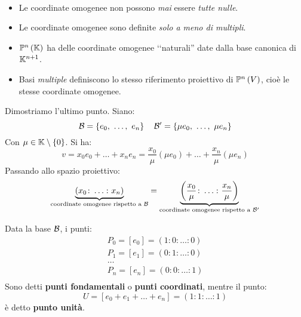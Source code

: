 \begin{observe}~{}
		\begin{itemize}
		\item Le coordinate omogenee non possono \textit{mai} essere \textit{tutte nulle}.
		\item Le coordinate omogenee sono definite \textit{solo a meno di multipli}.
		\item $\proj[n]{\kamp}$ ha delle coordinate omogenee ‘‘naturali'' date dalla base canonica di $\mathbb{K}^{n+1}$.
		\item Basi \textit{multiple} definiscono lo stesso riferimento proiettivo di $\proj{V}$, cioè le stesse coordinate omogenee.
	\end{itemize}
\end{observe}
\begin{demonstration}
	Dimostriamo l'ultimo punto. Siano:
	\begin{equation*}
		\basis=\left\{e_0,\ \ldots,\ e_n\right\}\quad\basis'=\left\{\mu e_0,\ \ldots,\ \mu e_n\right\}
	\end{equation*}
Con $\mu\in\mathbb{K}\setminus\left\{0\right\}$. Si ha:
\begin{equation*}
	v=x_0e_0+\ldots+x_ne_n=\frac{x_0}{\mu}\left(\mu e_0\right)+\ldots + \frac{x_n}{\mu}\left(\mu e_n\right)
\end{equation*}
Passando allo spazio proiettivo:
\begin{equation*}
\underbrace{\left(x_0\colon\ldots\colon x_n\right)}_{\text{coordinate omogenee rispetto a }\mathcal{B}}=\underbrace{\left(\frac{x_0}{\mu}\colon\ldots\colon \frac{x_n}{\mu}\right)}_{\text{coordinate omogenee rispetto a }\mathcal{B}'}
\end{equation*}
\end{demonstration}
\begin{define}
	Data la base $\mathcal{B}$, i punti:
	\begin{equation}
		\begin{array}{l}
			P_0=\left[e_0\right]=\left(1\colon0\colon\ldots\colon0\right)\\			P_1=\left[e_1\right]=\left(0\colon1\colon\ldots\colon0\right)\\
			\ldots\\
			P_n=\left[e_n\right]=\left(0\colon0\colon\ldots\colon1\right)\\
		\end{array}
	\end{equation}
Sono detti \textbf{punti fondamentali} o \textbf{punti coordinati}, mentre il punto:
\begin{equation*}
	U=\left[e_0+e_1+\ldots+e_n\right]=\left(1\colon1\colon\ldots\colon1\right)
\end{equation*}
è detto \textbf{punto unità}.
\end{define}
